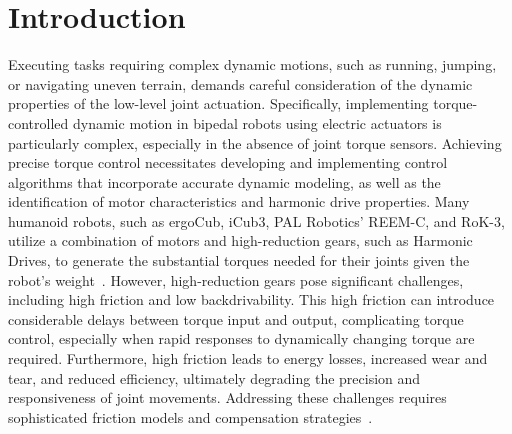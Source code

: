 \section{Introduction}
\label{sec:introdcution}


Executing tasks requiring complex dynamic motions, such as running, jumping, or navigating uneven terrain, demands careful consideration of the dynamic properties of the low-level joint actuation. Specifically, implementing torque-controlled dynamic motion in bipedal robots using electric actuators is particularly complex, especially in the absence of joint torque sensors. Achieving precise torque control necessitates developing and implementing control algorithms that incorporate accurate dynamic modeling, as well as the identification of motor characteristics and harmonic drive properties. Many humanoid robots, such as ergoCub, iCub3, PAL Robotics' REEM-C, and RoK-3, utilize a combination of motors and high-reduction gears, such as Harmonic Drives, to generate the substantial torques needed for their joints given the robot's weight~\cite{dafarra2024icub3,han2022slope,ossadnik2018adaptive,han2023implementing}. However, high-reduction gears pose significant challenges, including high friction and low backdrivability. This high friction can introduce considerable delays between torque input and output, complicating torque control, especially when rapid responses to dynamically changing torque are required. Furthermore, high friction leads to energy losses, increased wear and tear, and reduced efficiency, ultimately degrading the precision and responsiveness of joint movements. Addressing these challenges requires sophisticated friction models and compensation strategies~\cite{marques2016survey}.

